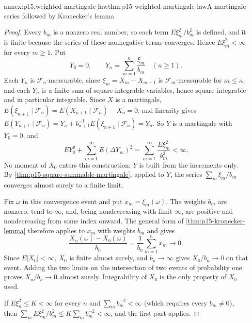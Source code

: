 \begin{annexitem}{annex:p15.weighted-martingale-law}{thm:p15-weighted-martingale-law}{A martingale series followed by Kronecker's lemma}
\begin{proof}
Every \(b_m\) is a nonzero real number, so each term
\(E\xi_m^2/b_m^2\) is defined, and it is finite because the series of
these nonnegative terms converges. Hence \(E\xi_m^2<\infty\) for every
\(m\geq1\). Put
\[
                         Y_0=0,\qquad
                         Y_n=\sum_{m=1}^n\frac{\xi_m}{b_m}\quad(n\geq1).
\]
Each \(Y_n\) is \(\mathcal F_n\)-measurable, since \(\xi_m=X_m-X_{m-1}\)
is \(\mathcal F_m\)-measurable for \(m\leq n\), and each \(Y_n\) is a
finite sum of square-integrable variables, hence square integrable and
in particular integrable. Since \(X\) is a martingale,
\(E(\xi_{n+1}\mid\mathcal F_n)=E(X_{n+1}\mid\mathcal F_n)-X_n=0\), and
linearity gives
\(E(Y_{n+1}\mid\mathcal F_n)=Y_n+b_{n+1}^{-1}E(\xi_{n+1}\mid\mathcal F_n)=Y_n\).
So \(Y\) is a martingale with \(Y_0=0\), and
\[
     EY_0^2+\sum_{m=1}^\infty E(\Delta Y_m)^2
            =\sum_{m=1}^\infty\frac{E\xi_m^2}{b_m^2}<\infty .
\]
No moment of \(X_0\) enters this construction: \(Y\) is built from the
increments only. By \cref{thm:p15-square-summable-martingale}, applied
to \(Y\), the series \(\sum_m\xi_m/b_m\) converges almost surely to a
finite limit.

Fix \(\omega\) in this convergence event and put
\(x_m=\xi_m(\omega)\). The weights \(b_m\) are nonzero, tend to
\(\infty\), and, being nondecreasing with limit \(\infty\), are positive
and nondecreasing from some index onward. The general form of
\cref{thm:p15-kronecker-lemma} therefore applies to \(x_m\) with
weights \(b_m\) and gives
\[
                  \frac{X_n(\omega)-X_0(\omega)}{b_n}
                         =\frac1{b_n}\sum_{m=1}^nx_m\longrightarrow0.
\]
Since \(E|X_0|<\infty\), \(X_0\) is finite almost surely, and
\(b_n\to\infty\) gives \(X_0/b_n\to0\) on that event. Adding the two
limits on the intersection of two events of probability one proves
\(X_n/b_n\to0\) almost surely. Integrability of \(X_0\) is the only
property of \(X_0\) used.

If \(E\xi_n^2\leq K<\infty\) for every \(n\) and
\(\sum_mb_m^{-2}<\infty\) (which requires every \(b_m\neq0\)), then
\(\sum_mE\xi_m^2/b_m^2\leq K\sum_mb_m^{-2}<\infty\), and the first part
applies.


\end{proof}
\end{annexitem}
